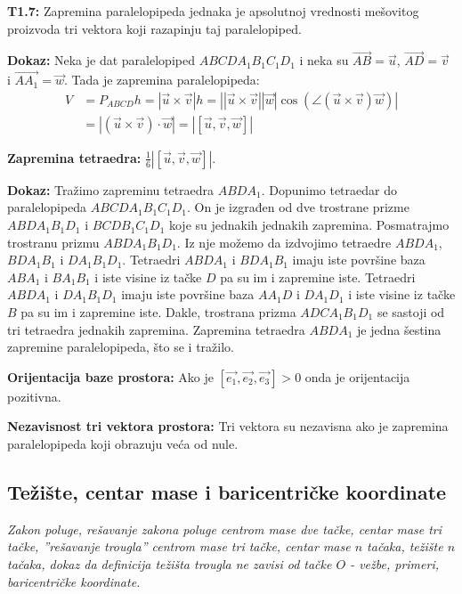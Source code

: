 \documentclass[12pt]{article}
\newcommand{\vek}[1]{\overrightarrow{#1}}
\begin{document}
\textbf{T1.7:} Zapremina paralelopipeda jednaka je apsolutnoj vrednosti
mešovitog proizvoda tri vektora koji razapinju taj paralelopiped.
\par
\textbf{Dokaz:} Neka je dat paralelopiped $ABCDA_1B_1C_1D_1$ i neka su
$\vek{AB}=\vek{u}$, $\vek{AD}=\vek{v}$ i $\vek{AA_1}=\vek{w}$. Tada je
zapremina paralelopipeda:
\begin{align*}
    V & =P_{ABCD}h=|\vek{u}\times\vek{v}|h=\left|\left|\vek{u}\times\vek{v}\right|
    \left|\vek{w}\right|\cos(\angle{(\vek{u}\times\vek{v})\vek{w}})\right|         \\
      & =|(\vek{u}\times\vek{v}) \cdot \vek{w}|=
    |[\vek{u},\vek{v},\vek{w}]|
\end{align*}
\par

\textbf{Zapremina tetraedra:} $\frac{1}{6}|[\vek{u},\vek{v},\vek{w}]|$.
\par
\textbf{Dokaz:} Tražimo zapreminu tetraedra $ABDA_1$. Dopunimo tetraedar do
paralelopipeda $ABCDA_1B_1C_1D_1$. On je izgrađen od dve trostrane prizme
$ABDA_1B_1D_1$ i $BCDB_1C_1D_1$ koje su jednakih jednakih zapremina.
Posmatrajmo trostranu prizmu $ABDA_1B_1D_1$. Iz nje možemo da izdvojimo
tetraedre $ABDA_1$, $BDA_1B_1$ i $DA_1B_1D_1$. Tetraedri $ABDA_1$ i $BDA_1B_1$
imaju iste površine baza $ABA_1$ i $BA_1B_1$ i iste visine iz tačke $D$ pa su
im i zapremine iste. Tetraedri $ABDA_1$ i $DA_1B_1D_1$ imaju iste površine baza
$AA_1D$ i $DA_1D_1$ i iste visine iz tačke $B$ pa su im i zapremine iste.
Dakle, trostrana prizma $ADCA_1B_1D_1$ se sastoji od tri tetraedra jednakih
zapremina. Zapremina tetraedra $ABDA_1$ je jedna šestina zapremine
paralelopipeda, što se i tražilo.
\par

\textbf{Orijentacija baze prostora:} Ako je $[\vek{e_1},\vek{e_2},\vek{e_3}]>0$
onda je orijentacija pozitivna.
\par

\textbf{Nezavisnost tri vektora prostora:} Tri vektora su nezavisna ako je
zapremina paralelopipeda koji obrazuju veća od nule.

\subsection{Težište, centar mase i baricentričke koordinate}
\textit{Zakon poluge, rešavanje zakona poluge centrom mase dve tačke, centar
    mase tri tačke, ”rešavanje trougla” centrom mase tri tačke, centar mase $n$
    tačaka, težište $n$ tačaka, dokaz da definicija težišta trougla ne zavisi
    od tačke $O$ - vežbe, primeri, baricentričke koordinate.}
\par
\vspace*{1cm}
\end{document}
